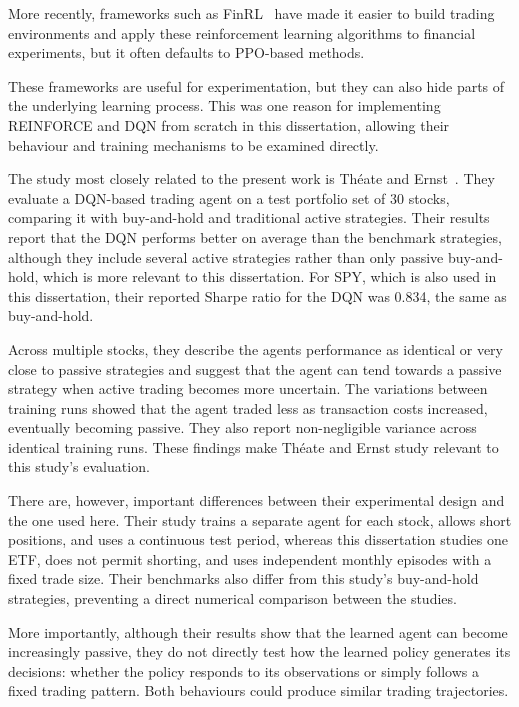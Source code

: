 More recently, frameworks such as FinRL~\cite{liu2020finrl} have made it easier to
build trading environments and apply these reinforcement learning
algorithms to financial experiments, but it often defaults to PPO-based
methods.

These frameworks are useful for experimentation, but they can also hide
parts of the underlying learning process. This was one reason for
implementing REINFORCE and DQN from scratch in this dissertation,
allowing their behaviour and training mechanisms to be examined
directly.

The study most closely related to the present work is Théate and Ernst~\cite{theate2021}. They evaluate a DQN-based trading agent on a test portfolio
set of 30 stocks, comparing it with buy-and-hold and traditional active
strategies. Their results report that the DQN performs better on average
than the benchmark strategies, although they include several active
strategies rather than only passive buy-and-hold, which is more relevant
to this dissertation. For SPY, which is also used in this dissertation,
their reported Sharpe ratio for the DQN was 0.834, the same as
buy-and-hold.

Across multiple stocks, they describe the agent\textquotesingle s
performance as identical or very close to passive strategies and suggest
that the agent can tend towards a passive strategy when active trading
becomes more uncertain. The variations between training runs showed that
the agent traded less as transaction costs increased, eventually
becoming passive. They also report non-negligible variance across
identical training runs. These findings make Théate and Ernst study
relevant to this study's evaluation.

There are, however, important differences between their experimental
design and the one used here. Their study trains a separate agent for
each stock, allows short positions, and uses a continuous test period,
whereas this dissertation studies one ETF, does not permit shorting, and
uses independent monthly episodes with a fixed trade size. Their
benchmarks also differ from this study's buy-and-hold strategies,
preventing a direct numerical comparison between the studies.

More importantly, although their results show that the learned agent can
become increasingly passive, they do not directly test how the learned
policy generates its decisions: whether the policy responds to its
observations or simply follows a fixed trading pattern. Both behaviours
could produce similar trading trajectories.

